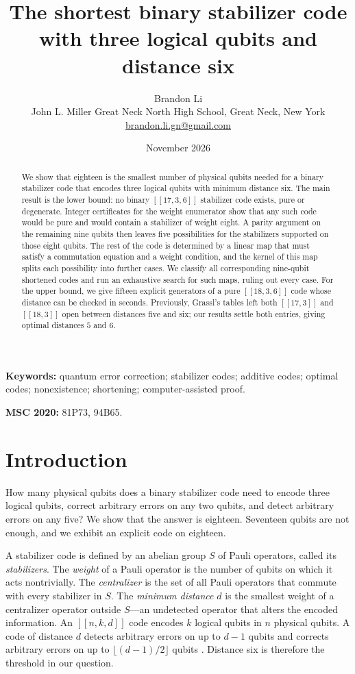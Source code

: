 \documentclass[11pt]{article}
\title{The shortest binary stabilizer code with three logical qubits and distance six}
\author{Brandon Li\\[0.2em]
\normalsize John L. Miller Great Neck North High School, Great Neck, New York\\
\normalsize\href{mailto:brandon.li.gn@gmail.com}{brandon.li.gn@gmail.com}}
\date{November 2026}
\theoremstyle{definition}
\theoremstyle{remark}
\newcommand{\qc}[1]{[\![#1]\!]}
\begin{document}
\maketitle

\begin{abstract}
We show that eighteen is the smallest number of physical qubits needed
for a binary stabilizer code that encodes three logical qubits with
minimum distance six. The main result is the lower bound: no binary
\(\qc{17,3,6}\) stabilizer code exists, pure or degenerate. Integer
certificates for the weight enumerator show that any such code would be
pure and would contain a stabilizer of weight eight. A parity argument
on the remaining nine qubits then leaves five possibilities for the
stabilizers supported on those eight qubits. The rest of the code is
determined by a linear map that must satisfy a commutation equation and
a weight condition, and the kernel of this map splits each possibility
into further cases. We classify all corresponding nine-qubit shortened
codes and run an exhaustive search for such maps, ruling out every case.
For the upper bound, we give fifteen explicit generators of a pure
\(\qc{18,3,6}\) code whose distance can be checked in seconds.
Previously, Grassl's tables left both \(\qc{17,3}\) and \(\qc{18,3}\)
open between distances five and six; our results settle both entries,
giving optimal distances \(5\) and \(6\).
\end{abstract}

\noindent\textbf{Keywords:} quantum error correction; stabilizer codes; additive
codes; optimal codes; nonexistence; shortening; computer-assisted proof.

\noindent\textbf{MSC 2020:} 81P73, 94B65.

\section{Introduction}\label{sec:intro}

How many physical qubits does a binary stabilizer code need to encode
three logical qubits, correct arbitrary errors on any two qubits, and
detect arbitrary errors on any five? We show that the answer is
eighteen. Seventeen qubits are not enough, and we exhibit an explicit
code on eighteen.

A stabilizer code \cite{gottesman,crss97,crss} is defined by an abelian
group \(S\) of Pauli operators, called its \emph{stabilizers}. The
\emph{weight} of a Pauli operator is the number of qubits on which it
acts nontrivially. The \emph{centralizer} is the set of all Pauli
operators that commute with every stabilizer in \(S\). The \emph{minimum
distance} \(d\) is the smallest weight of a centralizer operator outside
\(S\)---an undetected operator that alters the
encoded information. An \(\qc{n,k,d}\) code encodes \(k\) logical qubits
in \(n\) physical qubits. A code of distance \(d\) detects arbitrary
errors on up to \(d-1\) qubits and corrects arbitrary errors on up to
\(\lfloor (d-1)/2\rfloor\) qubits \cite{knilllaflamme}. Distance six is
therefore the threshold in our question.
\end{document}
